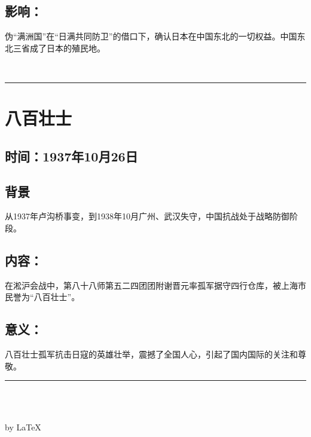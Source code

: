 \documentclass{article}
\begin{document}
\subsection*{影响：}
\noindent 伪``满洲国''在``日满共同防卫''的借口下，确认日本在中国东北的一切权益。中国东北三省成了日本的殖民地。


\ \hrule

\section*{八百壮士}
\subsection*{时间：1937年10月26日}
\subsection*{背景}
\noindent 从1937年卢沟桥事变，到1938年10月广州、武汉失守，中国抗战处于战略防御阶段。
\subsection*{内容：}
\noindent 在淞沪会战中，第八十八师第五二四团团附谢晋元率孤军据守四行仓库，被上海市民誉为“八百壮士”。
\subsection*{意义：}
\noindent 八百壮士孤军抗击日寇的英雄壮举，震撼了全国人心，引起了国内国际的关注和尊敬。
\\\hrule
\ \\ \ \\
\centerline{by \LaTeX}
\end{document}

